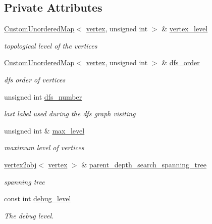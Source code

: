 \subsection*{Private Attributes}
\begin{DoxyCompactItemize}
\item 
\hyperlink{custom__map_8hpp_ad1ed68f2ff093683ab1a33522b144adc}{Custom\+Unordered\+Map}$<$ \hyperlink{graph_8hpp_abefdcf0544e601805af44eca032cca14}{vertex}, unsigned int $>$ \& \hyperlink{structdjgraph__dfs__tree__visitor_aa40978fd732b1b81d0eb185938acd673}{vertex\+\_\+level}
\begin{DoxyCompactList}\small\item\em topological level of the vertices \end{DoxyCompactList}\item 
\hyperlink{custom__map_8hpp_ad1ed68f2ff093683ab1a33522b144adc}{Custom\+Unordered\+Map}$<$ \hyperlink{graph_8hpp_abefdcf0544e601805af44eca032cca14}{vertex}, unsigned int $>$ \& \hyperlink{structdjgraph__dfs__tree__visitor_a8dd408eabb0ccaa9dcffcad8ded88d18}{dfs\+\_\+order}
\begin{DoxyCompactList}\small\item\em dfs order of vertices \end{DoxyCompactList}\item 
unsigned int \hyperlink{structdjgraph__dfs__tree__visitor_af788a15033166b7114d2f528b82d7cbc}{dfs\+\_\+number}
\begin{DoxyCompactList}\small\item\em last label used during the dfs graph visiting \end{DoxyCompactList}\item 
unsigned int \& \hyperlink{structdjgraph__dfs__tree__visitor_a80bef5d922d02a1316f23afb00a66f91}{max\+\_\+level}
\begin{DoxyCompactList}\small\item\em maximum level of vertices \end{DoxyCompactList}\item 
\hyperlink{structvertex2obj}{vertex2obj}$<$ \hyperlink{graph_8hpp_abefdcf0544e601805af44eca032cca14}{vertex} $>$ \& \hyperlink{structdjgraph__dfs__tree__visitor_adf4301f0b9fa023aa96ff606fc3a307a}{parent\+\_\+depth\+\_\+search\+\_\+spanning\+\_\+tree}
\begin{DoxyCompactList}\small\item\em spanning tree \end{DoxyCompactList}\item 
const int \hyperlink{structdjgraph__dfs__tree__visitor_a07ea37c00d7cf82b22ce3379ac8855f8}{debug\+\_\+level}
\begin{DoxyCompactList}\small\item\em The debug level. \end{DoxyCompactList}\end{DoxyCompactItemize}


